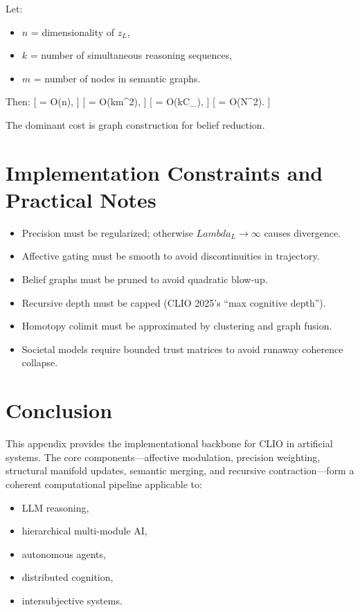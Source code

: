 \documentclass[12pt,oneside]{book}
\theoremstyle{plain}
\theoremstyle{definition}
\def\Lambda{Lambda}%
\begin{document}
Let:
\begin{itemize}
\item $n$ = dimensionality of $z_L$,
\item $k$ = number of simultaneous reasoning sequences,
\item $m$ = number of nodes in semantic graphs.
\end{itemize}

Then:
[
 = O(n),
]
[
 = O(km^2),
]
[
 = O(kC_{}),
]
[
 = O(N^2).
]

The dominant cost is graph construction for belief reduction.

\section{Implementation Constraints and Practical Notes}

\begin{itemize}
\item Precision must be regularized; otherwise $\Lambda_L \to \infty$ causes divergence.
\item Affective gating must be smooth to avoid discontinuities in trajectory.
\item Belief graphs must be pruned to avoid quadratic blow-up.
\item Recursive depth must be capped (CLIO 2025’s “max cognitive depth”).
\item Homotopy colimit must be approximated by clustering and graph fusion.
\item Societal models require bounded trust matrices to avoid runaway coherence collapse.
\end{itemize}

\section{Conclusion}

This appendix provides the implementational backbone for CLIO in artificial systems.
The core components—affective modulation, precision weighting, structural manifold
updates, semantic merging, and recursive contraction—form a coherent computational
pipeline applicable to:

\begin{itemize}
\item LLM reasoning,
\item hierarchical multi-module AI,
\item autonomous agents,
\item distributed cognition,
\item intersubjective systems.
\end{itemize}
\end{document}

